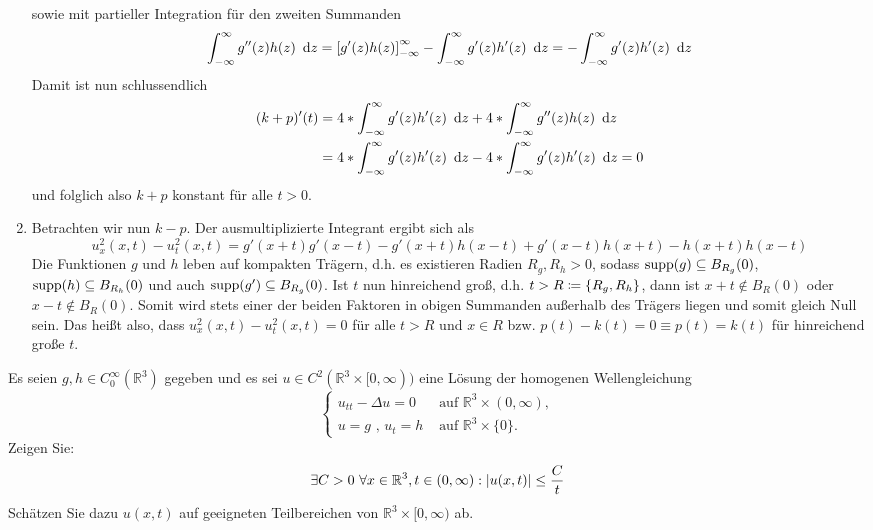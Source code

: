\begin{exercisePage}
\begin{enumerate}[label=(zu \alph*), leftmargin=*]
\begin{equation*}
		\end{equation*}
		sowie mit partieller Integration für den zweiten Summanden
		\begin{equation*}
			\int_{-\infty}^\infty g''(z) h(z) \enskip \mathrm{d}z 
			= \left[ g'(z) h(z) \right]_{-\infty}^\infty - \int_{-\infty}^\infty g'(z) h'(z) \enskip \mathrm{d}z 
			= - \int_{-\infty}^\infty g'(z) h'(z) \enskip \mathrm{d}z
		\end{equation*}
		Damit ist nun schlussendlich 
		\begin{equation*}
			\begin{aligned}
				(k+p)'(t) 
				&= 4 * \int_{-\infty}^\infty g'(z) h'(z) \enskip \mathrm{d}z +  4 * \int_{-\infty}^\infty g''(z) h(z) \enskip \mathrm{d}z \\
				&= 4 * \int_{-\infty}^\infty g'(z) h'(z) \enskip \mathrm{d}z - 4 * \int_{-\infty}^\infty g'(z) h'(z) \enskip \mathrm{d}z = 0
			\end{aligned}
		\end{equation*}
		und folglich also $k+p$ konstant für alle $t > 0$.
		
		\item Betrachten wir nun $k-p$. Der ausmultiplizierte Integrant ergibt sich als
		\begin{equation*}
			u_x^2(x,t) - u_t^2(x,t) = g'(x+t) g'(x-t) - g'(x+t) h(x-t) + g'(x-t) h(x+t) - h(x+t) h(x-t) 
		\end{equation*}
		Die Funktionen $g$ und $h$ leben auf kompakten Trägern, d.h. es existieren Radien $R_g, R_h > 0$, sodass $\operatorname{supp}(g) \subseteq B_{R_g}(0)$, $\operatorname{supp}(h) \subseteq B_{R_h}(0)$ und auch $\operatorname{supp}(g') \subseteq B_{R_g}(0)$. Ist $t$ nun hinreichend groß, d.h. $t > R \coloneqq \left\{ R_g, R_h \right\}$, dann ist $x+t \notin B_R(0)$ oder $x-t \notin B_R(0)$. Somit wird stets einer der beiden Faktoren in obigen Summanden außerhalb des Trägers liegen und somit gleich Null sein. Das heißt also, dass $u_x^2(x,t) - u_t^2(x,t) = 0$  für alle $t > R$ und $x \in R$ bzw. $p(t) - k(t) = 0 \equiv p(t) = k(t)$ für hinreichend große $t$.
	\end{enumerate}
	
	
	
	\begin{task}
		Es seien $g,h \in C_0^\infty(\mathbb{R}^3)$ gegeben und es sei $u \in C^2(\mathbb{R}^3\times [0,\infty))$ eine Lösung der homogenen Wellengleichung
		\begin{equation*}
		\begin{cases}
		u_{tt}-\Delta u = 0  &\text{ auf } \mathbb{R}^3 \times (0,\infty),
		\\
		u = g \mbox{ , } u_t = h &\text{ auf } \mathbb{R}^3 \times \{0\}.
		\end{cases}
		\end{equation*}
		Zeigen Sie:
		\begin{equation*}
			\exists C > 0 ~\forall x \in \mathbb R^3, t \in (0,\infty): \left| u(x,t) \right| \leq \frac{C}{t}
		\end{equation*}
		Schätzen Sie dazu $u(x,t)$ auf geeigneten Teilbereichen von $\mathbb{R}^3\times [0,\infty)$ ab.
	\end{task}


\end{exercisePage}
